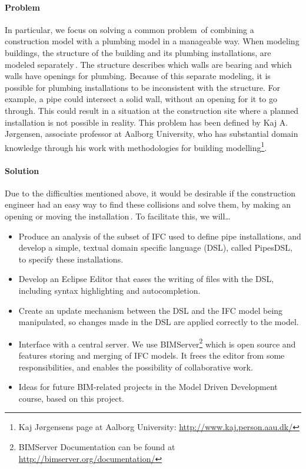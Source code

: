 \paragraph{Problem}
In particular, we focus on solving a common problem\,\cite[pp. 20]{jorgensen10} of combining a construction model with a plumbing model in a manageable way. When modeling buildings, the structure of the building and its plumbing installations, are modeled separately\,\cite[pp. 19--20]{jorgensen10}. The structure describes which walls are bearing and which walls have openings for plumbing.  Because of this separate modeling, it is possible for plumbing installations to be inconsistent with the structure. For example, a pipe could intersect a solid wall, without an opening for it to go through. This could result in a situation at the construction site where a planned installation is not possible in reality. This problem has been defined by Kaj A. Jørgensen, associate professor at Aalborg University, who has substantial domain knowledge through his work with methodologies for building modelling\footnote{Kaj Jørgensens page at Aalborg University: \url{http://www.kaj.person.aau.dk/}}.

\paragraph{Solution}
Due to the difficulties mentioned above, it would be desirable if the construction engineer had an easy way to find these collisions and solve them, by making an opening or moving the installation\,\cite{jorgensen12}. To facilitate this, we will…
\begin{itemize}
\item Produce an analysis of the subset of IFC used to define pipe installations, and develop a simple, textual domain specific language (DSL), called PipesDSL, to specify these installations.
\item Develop an Eclipse Editor that eases the writing of files with the DSL, including syntax highlighting and autocompletion.
\item Create an update mechanism between the DSL and the IFC model being manipulated, so changes made in the DSL are applied correctly to the model.
\item Interface with a central server. We use BIMServer\footnote{BIMServer Documentation can be found at \url{http://bimserver.org/documentation/}} which is open source and features storing and merging of IFC models. It frees the editor from some responsibilities, and enables the possibility of collaborative work.
\item Ideas for future BIM-related projects in the Model Driven Development course, based on this project.
\end{itemize}

